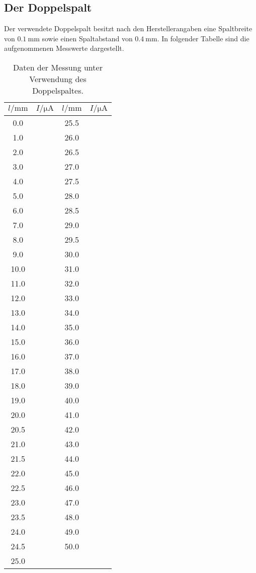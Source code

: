 \subsection{Der Doppelspalt}
Der verwendete Doppelspalt besitzt nach den Herstellerangaben eine Spaltbreite von
$\SI{0.1}{\milli\meter}$ sowie einen Spaltabstand von $\SI{0.4}{\milli\meter}$.
In folgender Tabelle sind die aufgenommenen Messwerte dargestellt.
\begin{table}[H]
  \centering
    \caption{Daten der Messung unter Verwendung des Doppelspaltes.}
    \label{tab:doppelspalt1}
    \begin{tabular}
      {S S[table-format=1.5] S S[table-format=1.5]}
      \toprule
      {$l / \si{\milli\meter}$} & {$I / \si{\micro\ampere}$} & {$l / \si{\milli\meter}$} & {$I / \si{\micro\ampere}$} \\
        &    & 25.5 &   \\
      1.0  &    & 26.0 &   \\
      2.0  &    & 26.5 &   \\
      3.0  &    & 27.0 &   \\
      4.0  &    & 27.5 &   \\
      5.0  &    & 28.0 &   \\
      6.0  &    & 28.5 &   \\
      7.0  &    & 29.0 &   \\
      8.0  &    & 29.5 &   \\
      9.0  &    & 30.0 &   \\
      10.0 &    & 31.0 &   \\
      11.0 &    & 32.0 &   \\
      12.0 &    & 33.0 &   \\
      13.0 &    & 34.0 &   \\
      14.0 &    & 35.0 &   \\
      15.0 &    & 36.0 &   \\
      16.0 &    & 37.0 &   \\
      17.0 &    & 38.0 &   \\
      18.0 &    & 39.0 &   \\
      19.0 &    & 40.0 &   \\
      20.0 &    & 41.0 &   \\
      20.5 &    & 42.0 &   \\
      21.0 &    & 43.0 &   \\
      21.5 &    & 44.0 &   \\
      22.0 &    & 45.0 &   \\
      22.5 &    & 46.0 &   \\
      23.0 &    & 47.0 &   \\
      23.5 &    & 48.0 &   \\
      24.0 &    & 49.0 &   \\
      24.5 &    & 50.0 &   \\
      25.0 &    &      &   \\
      \bottomrule
    \end{tabular}
  \end{table}
\noindent

